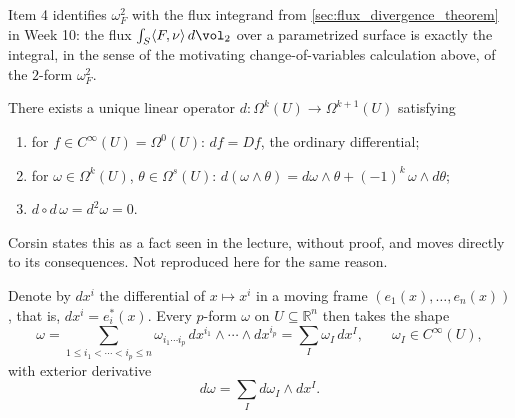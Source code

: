 \begin{ainote}
Item 4 identifies $\omega_F^2$ with the flux integrand from \cref{sec:flux_divergence_theorem}
in Week 10: the flux $\int_S \langle F,\nu\rangle\,d\vol_2$ over a parametrized surface is
exactly the integral, in the sense of the motivating change-of-variables calculation above, of
the $2$-form $\omega_F^2$.
\end{ainote}

\begin{theorem}
\label{thm:exterior_derivative}
There exists a unique linear operator $d : \Omega^k(U) \to \Omega^{k+1}(U)$ satisfying
\begin{enumerate}[label=\textbf{(\arabic*)}]
  \item for $f \in C^\infty(U) = \Omega^0(U)$: $df = Df$, the ordinary differential;
  \item for $\omega \in \Omega^k(U)$, $\theta \in \Omega^s(U)$: $d(\omega\wedge\theta) =
  d\omega\wedge\theta + (-1)^k\,\omega\wedge d\theta$;
  \item $d\circ d\,\omega = d^2\omega = 0$.
\end{enumerate}
\end{theorem}

\begin{ainote}
Corsin states this as a fact seen in the lecture, without proof, and moves directly to its
consequences. Not reproduced here for the same reason.
\end{ainote}

Denote by $dx^i$ the differential of $x \mapsto x^i$ in a moving frame $(e_1(x),\ldots,e_n(x))$,
that is, $dx^i = e_i^*(x)$. Every $p$-form $\omega$ on $U \subseteq \mathbb{R}^n$ then takes
the shape
\[\omega = \sum_{1\leq i_1<\cdots<i_p\leq n} \omega_{i_1\cdots i_p}\,dx^{i_1}\wedge\cdots\wedge
  dx^{i_p} = \sum_I \omega_I\,dx^I, \qquad \omega_I \in C^\infty(U),\]
with exterior derivative
\[d\omega = \sum_I d\omega_I \wedge dx^I.\]

